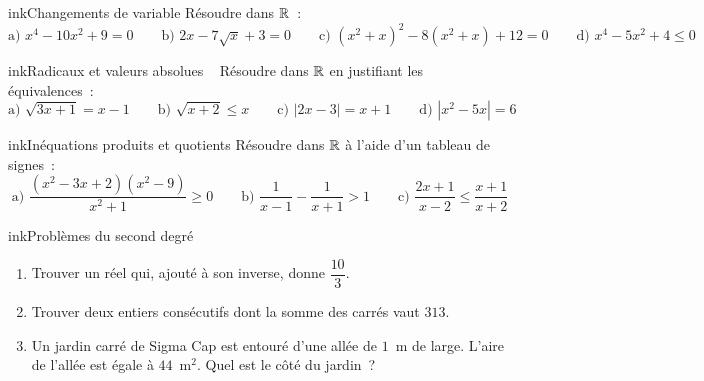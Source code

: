 \begin{exo}{ink}{Changements de variable }
Résoudre dans $\mathbb{R}$~:
\[
\text{a) } x^4-10x^2+9=0 \qquad \text{b) } 2x-7\sqrt x+3=0 \qquad \text{c) } (x^2+x)^2-8(x^2+x)+12=0 \qquad \text{d) } x^4-5x^2+4\leq0
\]
\end{exo}

\begin{exo}{ink}{Radicaux et valeurs absolues \ \demo}
Résoudre dans $\mathbb{R}$ en justifiant les équivalences~:
\[
\text{a) } \sqrt{3x+1}=x-1 \qquad \text{b) } \sqrt{x+2}\leq x \qquad \text{c) } |2x-3|=x+1 \qquad \text{d) } |x^2-5x|=6
\]
\end{exo}

\begin{exo}{ink}{Inéquations produits et quotients }
Résoudre dans $\mathbb{R}$ à l'aide d'un tableau de signes~:
\[
\text{a) } \frac{(x^2-3x+2)(x^2-9)}{x^2+1}\geq0 \qquad \text{b) } \frac1{x-1}-\frac1{x+1}>1 \qquad \text{c) } \frac{2x+1}{x-2}\leq\frac{x+1}{x+2}
\]
\end{exo}

\begin{exo}{ink}{Problèmes du second degré }
\begin{enumerate}
  \item Trouver un réel qui, ajouté à son inverse, donne $\dfrac{10}{3}$.
  \item Trouver deux entiers consécutifs dont la somme des carrés vaut $313$.
  \item Un jardin carré de Sigma Cap est entouré d'une allée de $1$~m de large. L'aire de l'allée est égale à $44$~m$^2$. Quel est le côté du jardin~?
\end{enumerate}
\end{exo}

